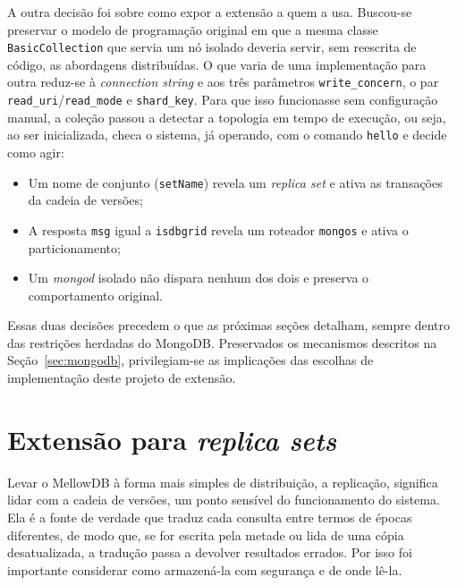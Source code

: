 A outra decisão foi sobre como expor a extensão a quem a usa. Buscou-se preservar o modelo de programação original em que a mesma classe \texttt{BasicCollection} que servia um nó isolado deveria servir, sem reescrita de código, as abordagens distribuídas. O que varia de uma implementação para outra reduz-se à \textit{connection string} e aos três parâmetros \texttt{write\_concern}, o par \texttt{read\_uri}/\texttt{read\_mode} e \texttt{shard\_key}. Para que isso funcionasse sem configuração manual, a coleção passou a detectar a topologia em tempo de execução, ou seja, ao ser inicializada, checa o sistema, já operando, com o comando \texttt{hello} e decide como agir:
\begin{itemize}
    \item Um nome de conjunto (\texttt{setName}) revela um \textit{replica set} e ativa as transações da cadeia de versões;
    \item A resposta \texttt{msg} igual a \texttt{isdbgrid} revela um roteador \texttt{mongos} e ativa o particionamento;
    \item Um \textit{mongod} isolado não dispara nenhum dos dois e preserva o comportamento original.
\end{itemize}

Essas duas decisões precedem o que as próximas seções detalham, sempre dentro das restrições herdadas do MongoDB. Preservados os mecanismos descritos na Seção~\ref{sec:mongodb}, privilegiam-se as implicações das escolhas de implementação deste projeto de extensão.

\section{Extensão para \textit{replica sets}}
\label{sec:ext-replicaset}

Levar o MellowDB à forma mais simples de distribuição, a replicação, significa lidar com a cadeia de versões, um ponto sensível do funcionamento do sistema. Ela é a fonte de verdade que traduz cada consulta entre termos de épocas diferentes, de modo que, se for escrita pela metade ou lida de uma cópia desatualizada, a tradução passa a devolver resultados errados. Por isso foi importante considerar como armazená-la com segurança e de onde lê-la.

